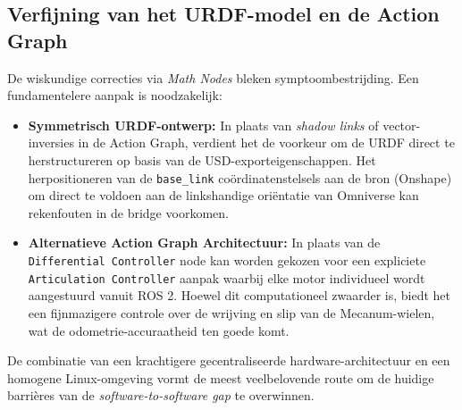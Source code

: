 \subsection{Verfijning van het URDF-model en de Action Graph}
De wiskundige correcties via \textit{Math Nodes} bleken symptoombestrijding. Een fundamentelere aanpak is noodzakelijk:
\begin{itemize}
    \item \textbf{Symmetrisch URDF-ontwerp:} In plaats van \textit{shadow links} of vector-inversies in de Action Graph, verdient het de voorkeur om de URDF direct te herstructureren op basis van de USD-exporteigenschappen. Het herpositioneren van de \texttt{base\_link} coördinatenstelsels aan de bron (Onshape) om direct te voldoen aan de linkshandige oriëntatie van Omniverse kan rekenfouten in de bridge voorkomen.
    \item \textbf{Alternatieve Action Graph Architectuur:} In plaats van de \texttt{Differential Controller} node kan worden gekozen voor een expliciete \texttt{Articulation Controller} aanpak waarbij elke motor individueel wordt aangestuurd vanuit ROS 2. Hoewel dit computationeel zwaarder is, biedt het een fijnmazigere controle over de wrijving en slip van de Mecanum-wielen, wat de odometrie-accuraatheid ten goede komt.
\end{itemize}

De combinatie van een krachtigere gecentraliseerde hardware-architectuur en een homogene Linux-omgeving vormt de meest veelbelovende route om de huidige barrières van de \textit{software-to-software gap} te overwinnen.